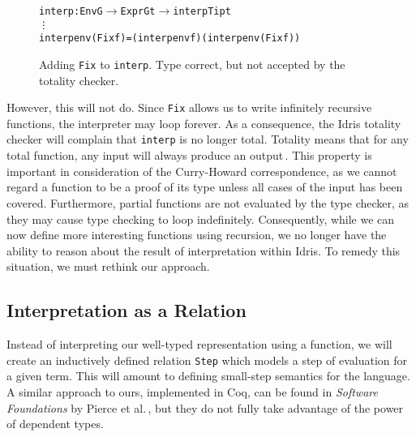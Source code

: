 \begin{figure}
\begin{alltt}
  interp : Env G \(\rightarrow\) Expr G t \(\rightarrow\) interpTip t
  \vdots
  interp env (Fix f) = (interp env f) (interp env (Fix f))
\end{alltt}
\caption{Adding \texttt{Fix} to \texttt{interp}. Type correct, but not accepted by the totality checker.}
\label{fig:interp-fix}
\end{figure}

However, this will not do. Since \texttt{Fix} allows us to write infinitely recursive functions, the interpreter may loop forever. As a consequence, the Idris totality checker will complain that \texttt{interp} is no longer total. Totality means that for any total function, any input will always produce an output\,\cite{Turner04totalfunctional}. This property is important in consideration of the Curry-Howard correspondence, as we cannot regard a function to be a proof of its type unless all cases of the input has been covered. Furthermore, partial functions are not evaluated by the type checker, as they may cause type checking to loop indefinitely. Consequently, while we can now define more interesting functions using recursion, we no longer have the ability to reason about the result of interpretation within Idris. To remedy this situation, we must rethink our approach.

\subsection{Interpretation as a Relation}
Instead of interpreting our well-typed representation using a function, we will create an inductively defined relation \texttt{Step} which models a step of evaluation for a given term. This will amount to defining small-step semantics for the language. A similar approach to ours, implemented in Coq, can be found in \textit{Software Foundations} by Pierce et al.\,\cite{Pierce:SF}, but they do not fully take advantage of the power of dependent types.

